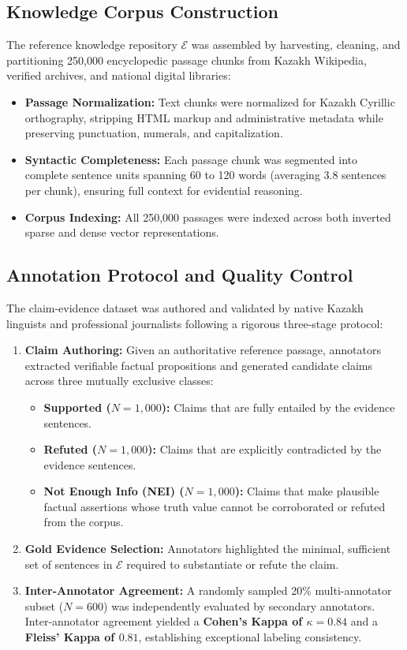 \subsection{Knowledge Corpus Construction}
The reference knowledge repository $\mathcal{E}$ was assembled by harvesting, cleaning, and partitioning 250,000 encyclopedic passage chunks from Kazakh Wikipedia, verified archives, and national digital libraries:
\begin{itemize}
    \item \textbf{Passage Normalization:} Text chunks were normalized for Kazakh Cyrillic orthography, stripping HTML markup and administrative metadata while preserving punctuation, numerals, and capitalization.
    \item \textbf{Syntactic Completeness:} Each passage chunk was segmented into complete sentence units spanning 60 to 120 words (averaging 3.8 sentences per chunk), ensuring full context for evidential reasoning.
    \item \textbf{Corpus Indexing:} All 250,000 passages were indexed across both inverted sparse and dense vector representations.
\end{itemize}

\subsection{Annotation Protocol and Quality Control}
The claim-evidence dataset was authored and validated by native Kazakh linguists and professional journalists following a rigorous three-stage protocol:
\begin{enumerate}
    \item \textbf{Claim Authoring:} Given an authoritative reference passage, annotators extracted verifiable factual propositions and generated candidate claims across three mutually exclusive classes:
    \begin{itemize}
        \item \textbf{Supported ($N=1,000$):} Claims that are fully entailed by the evidence sentences.
        \item \textbf{Refuted ($N=1,000$):} Claims that are explicitly contradicted by the evidence sentences.
        \item \textbf{Not Enough Info (NEI) ($N=1,000$):} Claims that make plausible factual assertions whose truth value cannot be corroborated or refuted from the corpus.
    \end{itemize}
    \item \textbf{Gold Evidence Selection:} Annotators highlighted the minimal, sufficient set of sentences in $\mathcal{E}$ required to substantiate or refute the claim.
    \item \textbf{Inter-Annotator Agreement:} A randomly sampled 20\% multi-annotator subset ($N=600$) was independently evaluated by secondary annotators. Inter-annotator agreement yielded a \textbf{Cohen's Kappa of $\kappa = 0.84$} and a \textbf{Fleiss' Kappa of $0.81$}, establishing exceptional labeling consistency.
\end{enumerate}

